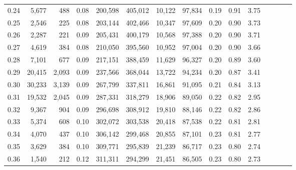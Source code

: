 \begin{tabular}{rrrcrrrrrrrrrrr}
0.24 &   5,677 &     488 &                                       0.08 &  200,598 &  405,012 &   10,122 &   97,834 &  0.19 &  0.91 &                         3.75 \\
0.25 &   2,546 &     225 &                                       0.08 &  203,144 &  402,466 &   10,347 &   97,609 &  0.20 &  0.90 &                         3.73 \\
0.26 &   2,287 &     221 &                                       0.09 &  205,431 &  400,179 &   10,568 &   97,388 &  0.20 &  0.90 &                         3.71 \\
0.27 &   4,619 &     384 &                                       0.08 &  210,050 &  395,560 &   10,952 &   97,004 &  0.20 &  0.90 &                         3.66 \\
0.28 &   7,101 &     677 &                                       0.09 &  217,151 &  388,459 &   11,629 &   96,327 &  0.20 &  0.89 &                         3.60 \\
0.29 &  20,415 &   2,093 &                                       0.09 &  237,566 &  368,044 &   13,722 &   94,234 &  0.20 &  0.87 &                         3.41 \\
0.30 &  30,233 &   3,139 &                                       0.09 &  267,799 &  337,811 &   16,861 &   91,095 &  0.21 &  0.84 &                         3.13 \\
0.31 &  19,532 &   2,045 &                                       0.09 &  287,331 &  318,279 &   18,906 &   89,050 &  0.22 &  0.82 &                         2.95 \\
0.32 &   9,367 &     904 &                                       0.09 &  296,698 &  308,912 &   19,810 &   88,146 &  0.22 &  0.82 &                         2.86 \\
0.33 &   5,374 &     608 &                                       0.10 &  302,072 &  303,538 &   20,418 &   87,538 &  0.22 &  0.81 &                         2.81 \\
0.34 &   4,070 &     437 &                                       0.10 &  306,142 &  299,468 &   20,855 &   87,101 &  0.23 &  0.81 &                         2.77 \\
0.35 &   3,629 &     384 &                                       0.10 &  309,771 &  295,839 &   21,239 &   86,717 &  0.23 &  0.80 &                         2.74 \\
0.36 &   1,540 &     212 &                                       0.12 &  311,311 &  294,299 &   21,451 &   86,505 &  0.23 &  0.80 &                         2.73 \\

\end{tabular}
